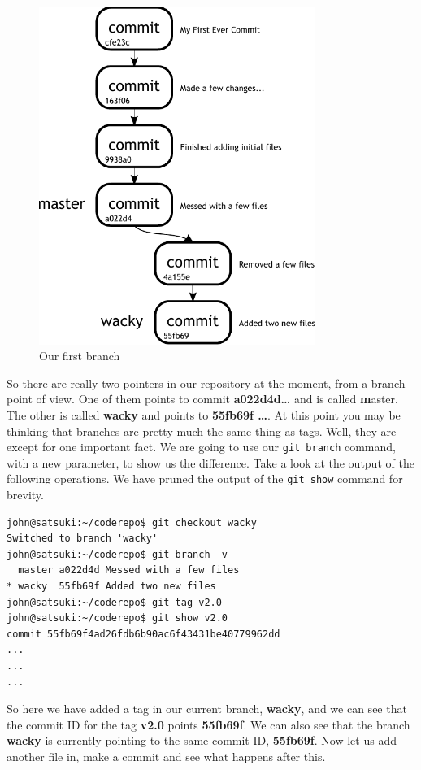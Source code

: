 \begin{figure}[hbt]
\centering
\includegraphics[width=9cm]{images/f-w4-d1.pdf}
\caption{Our first branch}
\end{figure}

So there are really two pointers in our repository at the moment, from a branch point of view.  One of them points to commit \textbf{a022d4d\ldots} and is called \textbf master.  The other is called \textbf{wacky} and points to \textbf{55fb69f
\ldots}.  At this point you may be thinking that branches are pretty much the same thing as tags.  Well, they are except for one important fact.  We are going to use our \texttt{git branch} command, with a new parameter, to show us the difference.  Take a look at the output of the following operations.  We have pruned the output of the \texttt{git show} command for brevity.

\begin{Verbatim}
john@satsuki:~/coderepo$ git checkout wacky 
Switched to branch 'wacky'
john@satsuki:~/coderepo$ git branch -v
  master a022d4d Messed with a few files
* wacky  55fb69f Added two new files
john@satsuki:~/coderepo$ git tag v2.0
john@satsuki:~/coderepo$ git show v2.0
commit 55fb69f4ad26fdb6b90ac6f43431be40779962dd
...
...
...
\end{Verbatim}

So here we have added a tag in our current branch, \textbf{wacky}, and we can see that the commit ID for the tag \textbf{v2.0} points \textbf{55fb69f}.  We can also see that the branch \textbf{wacky} is currently pointing to the same commit ID, \textbf{55fb69f}.  Now let us add another file in, make a commit and see what happens after this.

